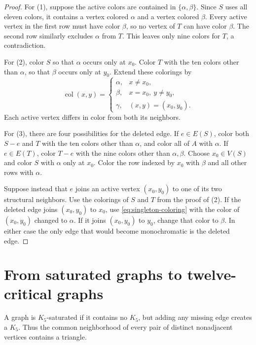 \documentclass[11pt]{article}
\numberwithin{equation}{section}
\newcommand{\col}{\operatorname{col}}
\begin{document}
\begin{proof}
For (1), suppose the active colors are contained in
\(\{\alpha,\beta\}\). Since \(S\) uses all eleven colors, it
contains a vertex colored \(\alpha\) and a vertex colored
\(\beta\). Every active vertex in the first row must have color
\(\beta\), so no vertex of \(T\) can have color \(\beta\).
The second row similarly excludes \(\alpha\) from \(T\).
This leaves only nine colors for \(T\), a contradiction.

For (2), color \(S\) so that \(\alpha\) occurs only at \(x_0\).
Color \(T\) with the ten colors other than \(\alpha\), so that
\(\beta\) occurs only at \(y_0\). Extend these colorings by
\begin{equation}\label{eq:singleton-coloring}
 \col(x,y)=
 \begin{cases}
 \alpha,&x\ne x_0,\\
 \beta,&x=x_0,\ y\ne y_0,\\
 \gamma,&(x,y)=(x_0,y_0).
 \end{cases}
\end{equation}
Each active vertex differs in color from both its neighbors.

For (3), there are four possibilities for the deleted edge.
If \(e\in E(S)\), color both \(S-e\) and \(T\) with the ten
colors other than \(\alpha\), and color all of \(A\) with
\(\alpha\). If \(e\in E(T)\), color \(T-e\) with the nine
colors other than \(\alpha,\beta\). Choose \(x_0\in V(S)\)
and color \(S\) with \(\alpha\) only at \(x_0\). Color the
row indexed by \(x_0\) with \(\beta\) and all other rows with
\(\alpha\).

Suppose instead that \(e\) joins an active vertex
\((x_0,y_0)\) to one of its two structural neighbors.
Use the colorings of \(S\) and \(T\) from the proof of (2).
If the deleted edge joins \((x_0,y_0)\) to \(x_0\), use
\eqref{eq:singleton-coloring} with the color of \((x_0,y_0)\)
changed to \(\alpha\). If it joins \((x_0,y_0)\) to \(y_0\),
change that color to \(\beta\). In either case the only edge
that would become monochromatic is the deleted edge.
\end{proof}

\section{From saturated graphs to twelve-critical graphs}
\label{sec:conversion}

A graph is \(K_5\)-saturated if it contains no \(K_5\), but
adding any missing edge creates a \(K_5\). Thus the common
neighborhood of every pair of distinct nonadjacent vertices
contains a triangle.
\end{document}

